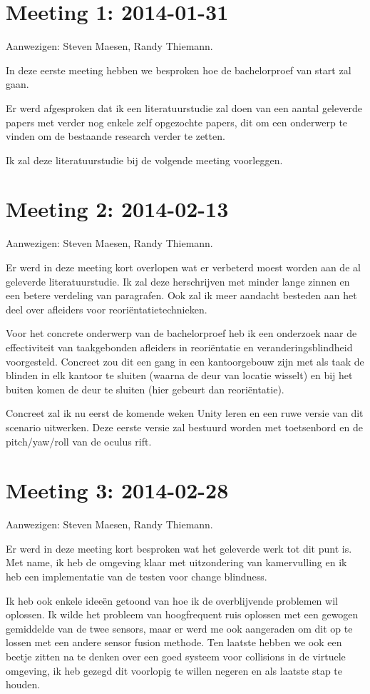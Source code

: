 \section{Meeting 1: 2014-01-31}
Aanwezigen: Steven Maesen, Randy Thiemann.

In deze eerste meeting hebben we besproken hoe de bachelorproef van start zal
gaan.

Er werd afgesproken dat ik een literatuurstudie zal doen van een aantal geleverde
papers met verder nog enkele zelf opgezochte papers, dit om een onderwerp te
vinden om de bestaande research verder te zetten.

Ik zal deze literatuurstudie bij de volgende meeting voorleggen.


\section{Meeting 2: 2014-02-13}
Aanwezigen: Steven Maesen, Randy Thiemann.

Er werd in deze meeting kort overlopen wat er verbeterd moest worden aan de
al geleverde literatuurstudie. Ik zal deze herschrijven met minder lange zinnen 
en een betere verdeling van paragrafen. Ook zal ik meer aandacht besteden aan het
deel over afleiders voor reoriëntatietechnieken.

Voor het concrete onderwerp van de bachelorproef heb ik een onderzoek naar de
effectiviteit van taakgebonden afleiders in reoriëntatie en veranderingsblindheid
voorgesteld. Concreet zou dit een gang in een kantoorgebouw zijn met als taak de
blinden in elk kantoor te sluiten (waarna de deur van locatie wisselt) en bij het
buiten komen de deur te sluiten (hier gebeurt dan reoriëntatie).

Concreet zal ik nu eerst de komende weken Unity leren en een ruwe versie van dit
scenario uitwerken. Deze eerste versie zal bestuurd worden met toetsenbord en de
pitch/yaw/roll van de oculus rift.


\section{Meeting 3: 2014-02-28}
Aanwezigen: Steven Maesen, Randy Thiemann.

Er werd in deze meeting kort besproken wat het geleverde werk tot dit punt is.
Met name, ik heb de omgeving klaar met uitzondering van kamervulling en ik heb
een implementatie van de testen voor change blindness.

Ik heb ook enkele ideeën getoond van hoe ik de overblijvende problemen wil
oplossen. Ik wilde het probleem van hoogfrequent ruis oplossen met een gewogen
gemiddelde van de twee sensors, maar er werd me ook aangeraden om dit op te
lossen met een andere sensor fusion methode. Ten laatste hebben we ook een beetje
zitten na te denken over een goed systeem voor collisions in de virtuele 
omgeving, ik heb gezegd dit voorlopig te willen negeren en als laatste stap te 
houden.

